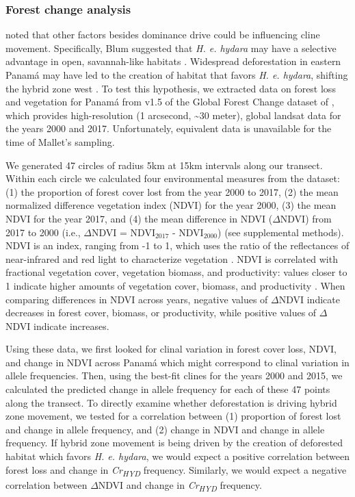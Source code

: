 \documentclass[]{article}
\begin{document}
\subsubsection{Forest change analysis}\label{forest-change-analysis}

\citet{Blum:2002wr} noted that other factors besides dominance drive
could be influencing cline movement. Specifically, Blum suggested that
\textit{H. e. hydara} may have a selective advantage in open,
savannah-like habitats \citep{Blum:2002wr, Blum:2008}. Widespread
deforestation in eastern Panamá may have led to the creation of habitat
that favors \textit{H. e. hydara}, shifting the hybrid zone west
\citep{Blum:2002wr}. To test this hypothesis, we extracted data on
forest loss and vegetation for Panamá from v1.5 of the Global Forest
Change dataset of \citet{Hansen:2013iy}, which provides high-resolution
(1 arcsecond, \textasciitilde{}30 meter), global landsat data for the
years 2000 and 2017. Unfortunately, equivalent data is unavailable for
the time of Mallet's \citeyear{Mallet:1986vj} sampling.

We generated 47 circles of radius 5km at 15km intervals along our
transect. Within each circle we calculated four environmental measures
from the \citet{Hansen:2013iy} dataset: (1) the proportion of forest
cover lost from the year 2000 to 2017, (2) the mean normalized
difference vegetation index (NDVI) for the year 2000, (3) the mean NDVI
for the year 2017, and (4) the mean difference in NDVI (\(\Delta\)NDVI)
from 2017 to 2000 (i.e., \(\Delta\)NDVI = NDVI\(_{2017}\) -
NDVI\(_{2000}\)) (see supplemental methods). NDVI is an index, ranging
from -1 to 1, which uses the ratio of the reflectances of near-infrared
and red light to characterize vegetation \citep{Pettorelli:2005ed}. NDVI
is correlated with fractional vegetation cover, vegetation biomass, and
productivity: values closer to 1 indicate higher amounts of vegetation
cover, biomass, and productivity
\citep{Carlson:1997wa, Pettorelli:2005ed}. When comparing differences in
NDVI across years, negative values of \(\Delta\)NDVI indicate decreases
in forest cover, biomass, or productivity, while positive values of
\(\Delta\)NDVI indicate increases.

Using these data, we first looked for clinal variation in forest cover
loss, NDVI, and change in NDVI across Panamá which might correspond to
clinal variation in allele frequencies. Then, using the best-fit clines
for the years 2000 and 2015, we calculated the predicted change in
allele frequency for each of these 47 points along the transect. To
directly examine whether deforestation is driving hybrid zone movement,
we tested for a correlation between (1) proportion of forest lost and
change in allele frequency, and (2) change in NDVI and change in allele
frequency. If hybrid zone movement is being driven by the creation of
deforested habitat which favors \textit{H. e. hydara}, we would expect a
positive correlation between forest loss and change in
\textit{Cr\textsubscript{HYD}} frequency. Similarly, we would expect a
negative correlation between \(\Delta\)NDVI and change in
\textit{Cr\textsubscript{HYD}} frequency.
\end{document}
